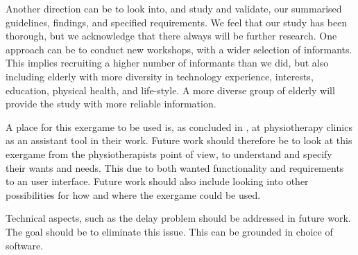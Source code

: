 Another direction can be to look into, and study and validate, our summarised guidelines, findings, and specified requirements. We feel that our study has been thorough, but we acknowledge that there always will be further research. One approach can be to conduct new workshops, with a wider selection of informants. This implies recruiting a higher number of informants than we did, but also including elderly with more diversity in technology experience, interests, education, physical health, and life-style. A more diverse group of elderly will provide the study with more reliable information.   

A place for this exergame to be used is, as concluded in \cite{project}, at physiotherapy clinics as an assistant tool in their work. Future work should therefore be to look at this exergame from the physiotherapists point of view, to understand and specify their wants and needs. This due to both wanted functionality and requirements to an user interface. Future work should also include looking into other possibilities for how and where the exergame could be used.   

Technical aspects, such as the delay problem should be addressed in future work. The goal should be to eliminate this issue. This can be grounded in choice of software. 
